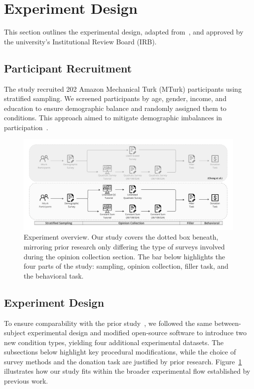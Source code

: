 \section{Experiment Design}
\label{sec:experiment}
This section outlines the experimental design, adapted from~\citet{chengCanShowWhat2021}, and approved by the university's Institutional Review Board (IRB).

\subsection{Participant Recruitment}
The study recruited 202 Amazon Mechanical Turk (MTurk) participants using stratified sampling. We screened participants by age, gender, income, and education to ensure demographic balance and randomly assigned them to conditions. This approach aimed to mitigate demographic imbalances in participation~\cite{redmilesHowWellMy2019}.

\begin{figure}[t]
    \centering
    \includegraphics[width=\textwidth]{content/image/whyqs_exp_flow.pdf}
    \caption{Experiment overview. Our study covers the dotted box beneath, mirroring prior research only differing the type of surveys involved during the opinion collection section. The bar below highlights the four parts of the study: sampling, opinion collection, filler task, and the behavioral task.}
    \label{fig:experiment}
\end{figure}

\subsection{Experiment Design}
To ensure comparability with the prior study~\cite{chengCanShowWhat2021}, we followed the same between-subject experimental design and modified open-source software to introduce two new condition types, yielding four additional experimental datasets. The subsections below highlight key procedural modifications, while the choice of survey methods and the donation task are justified by prior research. Figure~\ref{fig:experiment} illustrates how our study fits within the broader experimental flow established by previous work.

